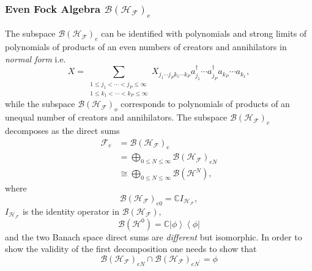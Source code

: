 \documentclass[aps,preprint]{revtex4}%
\begin{document}
\subsubsection{Even Fock Algebra $\mathcal{B}\left(  \mathcal{H}_{\mathcal{F}%
}\right)  _{e}$}

The subspace $\mathcal{B}\left(  \mathcal{H}_{\mathcal{F}}\right)  _{e}$ can
be identified with polynomials and strong limits of polynomials of products of
an even numbers of creators and annihilators in \emph{normal form} i.e.%
\begin{equation}
X=\sum_{\substack{1\leq j_{1}<\cdots<j_{P}\leq\infty\\1\leq k_{1}<\cdots
<k_{P}\leq\infty}}X_{j_{1}\cdots j_{P}k_{1}\cdots k_{P}}a_{j_{1}}^{\dagger
}\cdots a_{j_{P}}^{\dagger}a_{k_{P}}\cdots a_{k_{1}},
\end{equation}
while the subspace $\mathcal{B}\left(  \mathcal{H}_{\mathcal{F}}\right)  _{o}$
corresponds to polynomials of products of an unequal number of creators and
annihilators. The subspace $\mathcal{B}\left(  \mathcal{H}_{\mathcal{F}%
}\right)  _{e}$ decomposes as the direct sums
\begin{align}
\mathcal{F}_{e}  &  =\mathcal{B}\left(  \mathcal{H}_{\mathcal{F}}\right)
_{e}\nonumber\\
&  =%
{\displaystyle\bigoplus\limits_{0\leq N\leq\infty}}
\mathcal{B}\left(  \mathcal{H}_{\mathcal{F}}\right)  _{eN}\label{BanSp}\\
&  \cong%
{\displaystyle\bigoplus\limits_{0\leq N\leq\infty}}
\mathcal{B}\left(  \mathcal{H}^{N}\right)  , \label{BanAlg}%
\end{align}
where
\begin{equation}
\mathcal{B}\left(  \mathcal{H}_{\mathcal{F}}\right)  _{e0}=\mathbb{C}%
I_{\mathcal{H}_{\mathcal{F}}},
\end{equation}
$I_{\mathcal{H}_{\mathcal{F}}}$ is the identity operator in $\mathcal{B}%
\left(  \mathcal{H}_{\mathcal{F}}\right)  ,$%
\begin{equation}
\mathcal{B}\left(  \mathcal{H}^{0}\right)  =\mathbb{C}\left\vert
\phi\right\rangle \left\langle \phi\right\vert
\end{equation}
and the two Banach space direct sums are \emph{different} but isomorphic. In
order to show the validity of the first decomposition one needs to show that
\begin{equation}
\mathcal{B}\left(  \mathcal{H}_{\mathcal{F}}\right)  _{eN}\cap\mathcal{B}%
\left(  \mathcal{H}_{\mathcal{F}}\right)  _{eN^{\prime}}=\phi
\end{equation}
\end{document}
